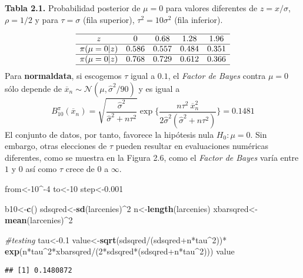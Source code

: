 \documentclass[12pt,]{article}
\newenvironment{Shaded}{\begin{snugshade}}{\end{snugshade}}
\newcommand{\KeywordTok}[1]{\textcolor[rgb]{0.13,0.29,0.53}{\textbf{{#1}}}}
\newcommand{\DecValTok}[1]{\textcolor[rgb]{0.00,0.00,0.81}{{#1}}}
\newcommand{\FloatTok}[1]{\textcolor[rgb]{0.00,0.00,0.81}{{#1}}}
\newcommand{\StringTok}[1]{\textcolor[rgb]{0.31,0.60,0.02}{{#1}}}
\newcommand{\CommentTok}[1]{\textcolor[rgb]{0.56,0.35,0.01}{\textit{{#1}}}}
\newcommand{\NormalTok}[1]{{#1}}
\begin{document}
\textbf{Tabla 2.1.} Probabilidad posterior de \(\mu=0\) para valores
diferentes de \(z=x/\sigma\), \(\rho=1/2\) y para \(\tau=\sigma\) (fila
superior), \(\tau^2=10\sigma^2\) (fila inferior).

\[
\begin{array}{ccccc}
\hline
z              & 0 & 0.68  & 1.28  & 1.96  \\ \hline
\pi(\mu=0|z)   & 0.586                  & 0.557 & 0.484 & 0.351 \\ \hline
\pi(\mu=0|z)   & 0.768                  & 0.729 & 0.612 & 0.366 \\ \hline
\end{array}
\] Para \textbf{normaldata}, si escogemos \(\tau\) igual a \(0.1\), el
\emph{Factor de Bayes} contra \(\mu=0\) sólo depende de
\(\overline{x}_n\sim\mathcal{N}(\mu,\hat\sigma^2/90)\) y es igual a \[
B_{10}^\pi(\overline{x}_n)=\sqrt{\frac{\hat\sigma^2}{\hat\sigma^2+n\tau^2}}\exp\bigg\{\frac{n\tau^2\ \overline{x}^2_n}{2\hat\sigma^2(\hat\sigma^2+n\tau^2)} \bigg\}=0.1481
\] El conjunto de datos, por tanto, favorece la hipótesis nula
\(H_0:\mu=0\). Sin embargo, otras elecciones de \(\tau\) pueden resultar
en evaluaciones numéricas diferentes, como se muestra en la Figura 2.6,
como el \emph{Factor de Bayes} varía entre \(1\) y \(0\) así como
\(\tau\) crece de \(0\) a \(\infty\).

\begin{Shaded}
\begin{Highlighting}[]
\NormalTok{from<-}\DecValTok{10}\NormalTok{^-}\DecValTok{4}
\NormalTok{to<-}\DecValTok{10}
\NormalTok{step<-}\FloatTok{0.001}

\NormalTok{b10<-}\KeywordTok{c}\NormalTok{()}
\NormalTok{sdsqred<-}\KeywordTok{sd}\NormalTok{(larcenies)^}\DecValTok{2}
\NormalTok{n<-}\KeywordTok{length}\NormalTok{(larcenies)}
\NormalTok{xbarsqred<-}\KeywordTok{mean}\NormalTok{(larcenies)^}\DecValTok{2}

\CommentTok{#testing}
\NormalTok{tau<-}\FloatTok{0.1}
\NormalTok{value<-}\KeywordTok{sqrt}\NormalTok{(sdsqred/(sdsqred+n*tau^}\DecValTok{2}\NormalTok{))*}
\StringTok{  }\KeywordTok{exp}\NormalTok{(n*tau^}\DecValTok{2}\NormalTok{*xbarsqred/(}\DecValTok{2}\NormalTok{*sdsqred*(sdsqred+n*tau^}\DecValTok{2}\NormalTok{)))}
\NormalTok{value}
\end{Highlighting}
\end{Shaded}

\begin{verbatim}
## [1] 0.1480872
\end{verbatim}
\end{document}
